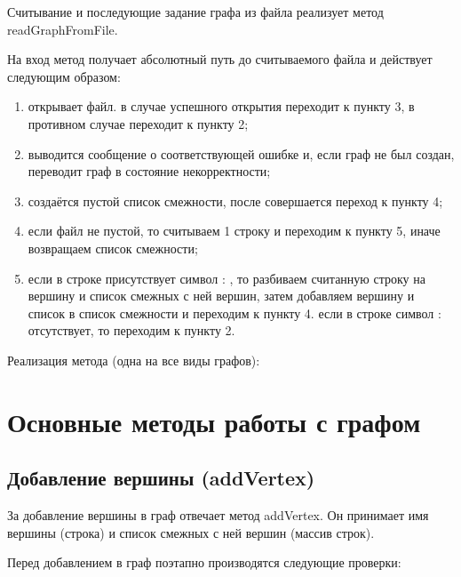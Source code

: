 \documentclass[bachelor, och, pract]{SCWorks}
\begin{document}
Считывание и последующие задание графа из файла реализует метод
readGraphFromFile.
\bigskip

На вход метод получает абсолютный путь до считываемого файла и действует
следующим образом:

\begin{enumerate}
  \item {открывает файл. в случае успешного открытия переходит к пункту 3, в
  противном случае переходит к пункту 2;}
  \item {выводится сообщение о соответствующей ошибке и, если граф не был создан, переводит граф
  в состояние некорректности;}
  \item {создаётся пустой список смежности, после совершается переход к пункту 4;}
  \item {если файл не пустой, то считываем 1 строку и переходим к пункту 5, иначе возвращаем список смежности;}
  \item {если в строке присутствует символ : , то разбиваем считанную строку на вершину и список смежных с ней вершин, затем добавляем
  вершину и список в список смежности и переходим к пункту 4. если в строке символ : отсутствует, то переходим к пункту 2.}
\end{enumerate}
\bigskip

Реализация метода (одна на все виды графов):
\bigskip


\bigskip

\section{Основные методы работы с графом}

\subsection{Добавление вершины (addVertex)}

За добавление вершины в граф отвечает метод addVertex.
Он принимает имя вершины (строка) и список смежных
с ней вершин (массив строк).
\bigskip

Перед добавлением в граф поэтапно производятся следующие
проверки:
\end{document}
